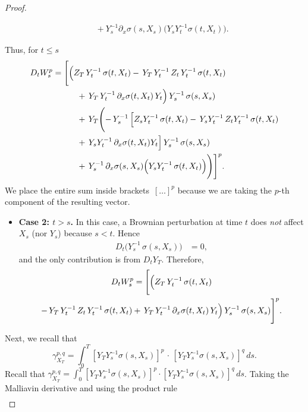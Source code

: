 \documentclass[]{interact}
\newcommand{\1}{\mathbf{1}}
\theoremstyle{plain}%
\theoremstyle{definition}
\theoremstyle{remark}
\numberwithin{equation}{section}
\begin{document}
\begin{proof}
\begin{itemize}
\begin{align*}
        &\quad + Y_s^{-1} \partial_x \sigma(s, X_s) \bigl(Y_s Y_t^{-1} \sigma(t, X_t)\bigr).
        \end{align*}
\end{itemize}
%
Thus, for \(t \leq s\)
\begin{align*}
\begin{aligned}
D_t W_s^p =
 \Biggl[&\Bigl( Z_T\,Y_t^{-1}\,\sigma(t, X_t)
-\, Y_T\,Y_t^{-1}\,Z_t\,Y_t^{-1}\,\sigma(t, X_t) \\
&\quad +\, Y_T\,Y_t^{-1}\,\partial_x \sigma(t, X_t)\,Y_t \Bigr)\,Y_s^{-1}\,\sigma(s, X_s) \\
&\quad +\, Y_T \Biggl( 
-\, Y_s^{-1}\,\Bigl[ Z_s Y_t^{-1}\,\sigma(t, X_t)
-\, Y_s Y_t^{-1}\,Z_t Y_t^{-1}\,\sigma(t, X_t) \\
&\quad +\, Y_s Y_t^{-1}\,\partial_x \sigma(t, X_t) Y_t \Bigr]\,Y_s^{-1}\,\sigma(s, X_s) \\
&\quad +\, Y_s^{-1}\,\partial_x \sigma(s, X_s) \Bigl( Y_s Y_t^{-1}\,\sigma(t, X_t) \Bigr)
\Biggr)\Biggr]^p.
\end{aligned}
\end{align*}
%
We place the entire sum inside brackets \(\,[\dots]^p\) because we are taking 
the \(p\)-th component of the resulting vector.
\begin{itemize}
    \item \textbf{Case 2: \(t > s\).} 
    In this case, a Brownian perturbation at time \(t\) does \emph{not} affect \(X_s\) 
    (nor \(Y_s\)) because \(s<t\).  
    Hence
    \begin{align*}
    D_t \bigl(Y_s^{-1}\,\sigma(s, X_s)\bigr)
    &= 
    0,
    \end{align*}
    and the only contribution is from \(D_t Y_T\). 
    Therefore,
    \begin{multline*}
    D_t W_s^p
    = \Biggl[
      \Bigl(
        Z_T\,Y_t^{-1}\,\sigma(t, X_t) \\
        -\, Y_T\,Y_t^{-1}\,Z_t\,Y_t^{-1}\,\sigma(t, X_t)
        +\, Y_T\,Y_t^{-1}\,\partial_x \sigma(t, X_t)\,Y_t
      \Bigr)\,Y_s^{-1}\,\sigma(s, X_s)
    \Biggr]^p.
    \end{multline*}
\end{itemize}
%
Next, we recall that 
\[\displaystyle \gamma_{X_T}^{p,q} = \int_0^T [Y_T Y_s^{-1} \sigma(s, X_s)]^p \,\cdot\,[Y_T Y_s^{-1} \sigma(s, X_s)]^q\,ds.\]
%
Recall that $\gamma_{X_T}^{p,q} = \int_0^T [Y_T Y_s^{-1} \sigma(s, X_s)]^p \cdot [Y_T Y_s^{-1} \sigma(s, X_s)]^q\,ds$. Taking the Malliavin derivative and using the product rule
\begin{align}

\end{align}
\end{proof}
\end{document}
